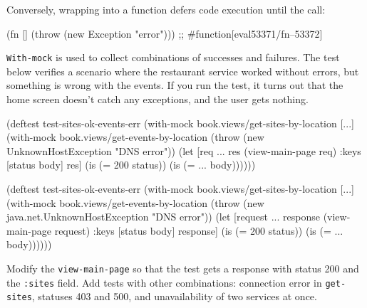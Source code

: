 
\noindent
Conversely, wrapping into a function defers code execution until the call:

\begin{english}
  \begin{clojure}
(fn [] (throw (new Exception "error")))
;; #function[eval53371/fn--53372]
  \end{clojure}
\end{english}

\verb|With-mock| is used to collect combinations of successes and failures. The test below verifies a scenario where the restaurant service worked without errors, but something is wrong with the events. If you run the test, it turns out that the home screen doesn't catch any exceptions, and the user gets nothing.

\ifx\DEVICETYPE\MOBILE

\begin{english}
  \begin{clojure/lines}
(deftest test-sites-ok-events-err
  (with-mock
    book.views/get-sites-by-location
    [...]
    (with-mock
     book.views/get-events-by-location
     (throw
      (new UnknownHostException
        "DNS error"))
     (let [req {...}
           res (view-main-page req)
           {:keys [status body]} res]
       (is (= 200 status))
       (is (= {...} body))))))
  \end{clojure/lines}
\end{english}

\else

\begin{english}
  \begin{clojure/lines}
(deftest test-sites-ok-events-err
  (with-mock book.views/get-sites-by-location [...]
    (with-mock book.views/get-events-by-location
      (throw (new java.net.UnknownHostException "DNS error"))
      (let [request {...}
            response (view-main-page request)
            {:keys [status body]} response]
        (is (= 200 status))
        (is (= {...} body))))))
  \end{clojure/lines}
\end{english}

\fi

Modify the \verb|view-main-page| so that the test gets a response with status 200 and the \verb|:sites| field. Add tests with other combinations: connection error in \verb|get-sites|, statuses 403 and 500, and unavailability of two services at once.

